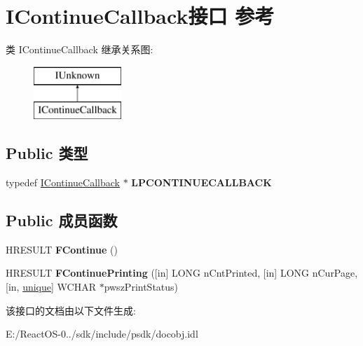 \hypertarget{interface_i_continue_callback}{}\section{I\+Continue\+Callback接口 参考}
\label{interface_i_continue_callback}
类 I\+Continue\+Callback 继承关系图\+:\begin{figure}[H]
\begin{center}
\leavevmode
\includegraphics[height=2.000000cm]{interface_i_continue_callback}
\end{center}
\end{figure}
\subsection*{Public 类型}
\begin{DoxyCompactItemize}
\item 
\mbox{\label{interface_i_continue_callback_accb2b29f3e3a5feb32554a1947ae7260}} 
typedef \hyperlink{interface_i_continue_callback}{I\+Continue\+Callback} $\ast$ {\bfseries L\+P\+C\+O\+N\+T\+I\+N\+U\+E\+C\+A\+L\+L\+B\+A\+CK}
\end{DoxyCompactItemize}
\subsection*{Public 成员函数}
\begin{DoxyCompactItemize}
\item 
\mbox{\label{interface_i_continue_callback_afa013ff2c159381ef830dafbfa6b2581}} 
H\+R\+E\+S\+U\+LT {\bfseries F\+Continue} ()
\item 
\mbox{\label{interface_i_continue_callback_af214e34f13b976acd704d6f68a131d31}} 
H\+R\+E\+S\+U\+LT {\bfseries F\+Continue\+Printing} (\mbox{[}in\mbox{]} L\+O\+NG n\+Cnt\+Printed, \mbox{[}in\mbox{]} L\+O\+NG n\+Cur\+Page, \mbox{[}in, \hyperlink{interfaceunique}{unique}\mbox{]} W\+C\+H\+AR $\ast$pwsz\+Print\+Status)
\end{DoxyCompactItemize}


该接口的文档由以下文件生成\+:\begin{DoxyCompactItemize}
\item 
E\+:/\+React\+O\+S-\/0../sdk/include/psdk/docobj.\+idl\end{DoxyCompactItemize}
